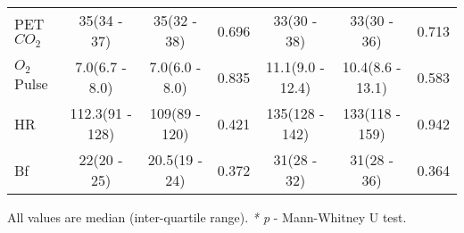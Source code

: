 \begin{sidewaystable}[p]
\begin{tabular}{l | c c c | c c c}
		PET$CO_2$                    & 35(34 - 37)       & 35(32 - 38)       & 0.696 & 33(30 - 38)       & 33(30 - 36)       & 0.713 \\
		$O_2$Pulse                   & 7.0(6.7 - 8.0)    & 7.0(6.0 - 8.0)    & 0.835 & 11.1(9.0 - 12.4)  & 10.4(8.6 - 13.1)  & 0.583 \\
		HR                           & 112.3(91 - 128)   & 109(89 - 120)     & 0.421 & 135(128 - 142)    & 133(118 - 159)    & 0.942 \\
		Bf                           & 22(20 - 25)       & 20.5(19 - 24)     & 0.372 & 31(28 - 32)       & 31(28 - 36)       & 0.364 \\ \hline
	\end{tabular}
		
	All values are median (inter-quartile range). \textit{* p} - Mann-Whitney U test.
\end{sidewaystable}